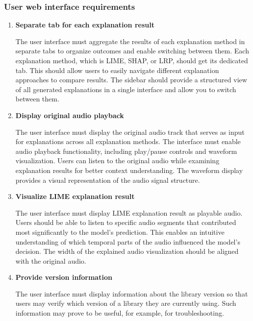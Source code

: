 \documentclass[
    bindingoffset=5mm,  %
    footnoteindent=3mm, %
    hyphenation=true    %
]{src/wut-thesis}
\begin{document}
\subsubsection{User web interface requirements}
    \begin{enumerate}
    \item \textbf{Separate tab for each explanation result}

            The user interface must aggregate the results of each explanation method in separate tabs to organize
        outcomes and enable switching between them. Each explanation method, which is LIME, SHAP, or LRP,
        should get its dedicated tab. This should allow users to easily navigate different explanation approaches
        to compare results. The sidebar should provide a structured view of all generated explanations in a single
        interface and allow you to switch between them.

    \item \textbf{Display original audio playback}

        The user interface must display the original audio track that serves as input for explanations across all
    explanation methods. The interface must enable audio playback functionality, including play/pause controls and
    waveform visualization. Users can listen to the original audio while examining explanation results for better
    context understanding. The waveform display provides a visual representation of the audio signal structure.

    \item \textbf{Visualize LIME explanation result}

        The user interface must display LIME explanation result as playable audio.
    Users should be able to listen to specific audio segments that contributed most significantly
    to the model's prediction. This enables an intuitive understanding of which temporal parts of
    the audio influenced the model's decision. The width of the explained audio visualization
    should be aligned with the original audio.

    \item \textbf{Provide version information}

        The user interface must display information about the library version so that users may verify which
    version of a library they are currently using. Such information may prove to be useful,
    for example, for troubleshooting.


\end{enumerate}
\end{document}
